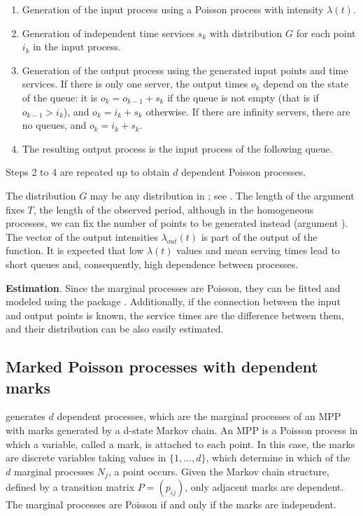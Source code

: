 \begin{enumerate}
	
	\item   Generation of  the input process using a   Poisson process with  intensity $\lambda(t)$.
	
	\item Generation of independent time services $s_k$ with distribution $G$  for each point  $i_k$ in the input process.
	
	\item  Generation of  the output process using the generated input points and  time services.  If there is only one server, the output times $o_k$ depend on the state of the queue:  it is $o_k=o_{k-1}+s_k$ if the queue is not empty (that is if  $o_{k-1}> i_k$),   and $o_k=i_{k}+s_k$ otherwise.
	If there are infinity servers,   there are no queues, and  $o_k=i_{k}+s_k$.
	
	\item  The resulting output  process  is the input process  of the following queue.
	
	
\end{enumerate}    


Steps 2 to 4 are repeated up to obtain $d$ dependent Poisson processes.


The   distribution  $G$  may be any  distribution  in ; see .    The length of the argument  fixes $T$,  the length of the observed period, although in the homogeneous processes,   we can fix  the number of points to be generated instead  (argument ).  The  vector of the output  intensities $\lambda_{out}(t)$ is  part of the output  of the function.
It is expected that low  $\lambda(t)$  values and  mean serving  times lead to short queues and, consequently, high dependence between processes.

\textbf{Estimation}. Since the marginal processes are Poisson, they can be fitted and modeled  using the  package .	Additionally, if the connection between the input and output points is known, the service times  are the difference between them, and their distribution can be also easily estimated.

\subsection{Marked Poisson processes  with dependent marks}

 generates  $d$ dependent processes,  which are the marginal processes of an MPP with  marks generated by a d-state Markov chain. 	An MPP is a Poisson process  in which a  variable, called a mark, is attached to each point. In this case, the marks are discrete variables taking values in $\{1, \ldots, d\}$,  which determine  in which of the $d$ marginal processes $N_j$, a point  occurs. Given the Markov chain structure, defined  by a transition matrix $P=(p_{ij})$,  only  adjacent  marks  are dependent. The marginal  processes  are  Poisson  if and only if the marks are independent.



